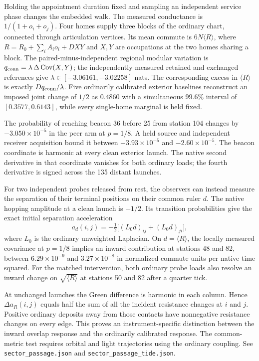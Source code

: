 \documentclass[11pt]{article}
\begin{document}
Holding the appointment duration fixed and sampling an independent
service phase changes the embedded walk. The measured conductance
is \(1/(1+o_i+o_j)\). Four homes supply three blocks of the ordinary
chart, connected through articulation vertices. Its mean commute is
\(6N\langle R\rangle\), where \(R=R_0+\sum_i A_i o_i+DXY\) and
\(X,Y\) are occupations at the two homes sharing a block. The
paired-minus-independent regional modular variation is
\(q_{\rm conn}=\lambda\,\Delta\operatorname{Cov}(X,Y)\);
the independently measured retained and exchanged references give
\(\lambda\in[-3.06161,-3.02258]\) nats. The corresponding excess in
\(\langle R\rangle\) is exactly \(Dq_{\rm conn}/\lambda\).
Five ordinarily calibrated exterior baselines reconstruct an imposed
joint change of \(1/2\) as \(0.4860\) with a simultaneous 99.6\%
interval of \([0.3577,0.6143]\), while every single-home marginal
is held fixed.

The probability of reaching beacon 36 before 25 from station 104
changes by \(-3.050\times10^{-5}\) in the peer arm at \(p=1/8\).
A held source and independent receiver acquisition bound it between
\(-3.93\times10^{-5}\) and \(-2.60\times10^{-5}\). The beacon
coordinate is harmonic at every clean exterior launch. The native
second derivative in that coordinate vanishes for both ordinary
loads; the fourth derivative is signed across the 135 distant
launches.

For two independent probes released from rest, the observers can
instead measure the separation of their terminal positions on
their common ruler \(d\). The native hopping amplitude at a clean
launch is \(-1/2\). Its transition probabilities give the exact
initial separation acceleration
\[
 a_d(i,j)=-\tfrac12\big[(L_0d)_{ij}+(L_0d)_{ji}\big],
\]
where \(L_0\) is the ordinary unweighted Laplacian. On \(d=\langle
R\rangle\), the locally measured covariance at \(p=1/8\) implies an
inward contribution at stations 48 and 82, between
\(6.29\times10^{-9}\) and \(3.27\times10^{-8}\) in normalized
commute units per native time squared. For the matched intervention,
both ordinary probe loads also resolve an inward change on
\(\sqrt{\langle R\rangle}\) at stations 50 and 82 after a quarter tick.

At unchanged launches the Green difference is harmonic in each
column. Hence \(\Delta a_R(i,j)\) equals half the sum of all the
incident resistance changes at \(i\) and \(j\). Positive ordinary
deposits away from those contacts have nonnegative resistance changes
on every edge. This proves an instrument-specific distinction between
the inward overlap response and the ordinarily calibrated response.
The common-metric test requires orbital and light trajectories using
the ordinary coupling. See \texttt{sector\_passage.json}
and \texttt{sector\_passage\_tide.json}.
\end{document}
